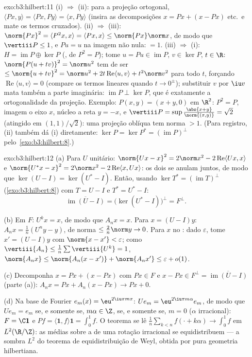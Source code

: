 \begin{solution}{exo:b3:hilbert:11}
(i) $\Rightarrow$ (ii): para a projeção ortogonal,
$\langle Px, y\rangle = \langle Px, Py\rangle = \langle x,
Py\rangle$ (insira as decomposições $x = Px + (x - Px)$
etc.\ e mate os termos cruzados). (ii) $\Rightarrow$ (iii):
$\norm{Px}^2 = \langle P^2x, x\rangle = \langle Px, x\rangle
\leq \norm{Px}\norm x$, de modo que $\vertiii P \leq 1$, e $Pu = u$
na imagem não nula: $= 1$. (iii) $\Rightarrow$ (i): $H =
\operatorname{im}P \oplus \ker P$ (, de $P^2
= P$); tome $u = Pu \in \operatorname{im}P$, $v \in \ker P$,
$t \in \R$: $\norm{P(u + tv)}^2 = \norm u^2$ tem de ser $\leq
\norm{u + tv}^2 = \norm u^2 + 2t\operatorname{Re}\langle u,
v\rangle + t^2\norm v^2$ para todo $t$, forçando
$\operatorname{Re}\langle u, v\rangle = 0$ (compare os
termos lineares quando $t \to 0^\pm$); substituir $v$ por $\iu v$
mata também a parte imaginária: $\operatorname{im}P \perp
\ker P$, que é exatamente a ortogonalidade da projeção.
Exemplo: $P(x, y) = (x + y, 0)$ em $\R^2$: $P^2 = P$,
imagem o eixo $x$, núcleo a reta $y = -x$, e
$\vertiii P = \sup\frac{\abs{x+y}}{\norm{(x,y)}} = \sqrt2$
(atingido em $(1,1)/\sqrt2$): uma projeção oblíqua tem norma
$> 1$. (Para registro, (ii) também dá (i) diretamente:
$\ker P = \ker P^* = (\operatorname{im}P)^\perp$ pelo~\cref{exo:b3:hilbert:8}.)
\end{solution}

\begin{solution}{exo:b3:hilbert:12}
(a) Para $U$ unitário: $\norm{Ux - x}^2 = 2\norm x^2 -
2\operatorname{Re}\langle Ux, x\rangle$ e $\norm{U^*x -
x}^2 = 2\norm x^2 - 2\operatorname{Re}\langle x, Ux\rangle$:
os dois se anulam juntos, de modo que $\ker(U - I) = \ker(U^* - I)$.
Então, usando $\ker T^* = (\operatorname{im}T)^\perp$
(\cref{exo:b3:hilbert:8}) com $T = U - I$ e $T^* = U^* -
I$:
\[
\overline{\operatorname{im}(U - I)} = \bigl(\ker(U^* -
I)\bigr)^\perp = F^\perp .
\]

(b) Em $F$: $U^kx = x$, de modo que $A_nx = x$. Para $x = (U - I)y$:
$A_nx = \frac1n(U^ny - y)$, de norma $\leq \frac2n\norm y \to
0$. Para $x$ no : dado $\varepsilon$, tome $x' =
(U - I)y$ com $\norm{x - x'} < \varepsilon$; como
$\vertiii{A_n} \leq \frac1n\sum\vertiii{U^k} = 1$,
$\norm{A_nx} \leq \norm{A_n(x - x')} + \norm{A_nx'} \leq
\varepsilon + o(1)$.

(c) Decomponha $x = Px + (x - Px)$ com $Px \in F$ e $x -
Px \in F^\perp = \overline{\operatorname{im}(U - I)}$ (parte
(a)): $A_nx = Px + A_n(x - Px) \to Px + 0$.

(d) Na base de Fourier $e_m(x) = \eu^{2\iu\pi mx}$: $Ue_m
= \eu^{2\iu\pi m\alpha}e_m$, de modo que $Ue_m = e_m$ se, e somente se, $m\alpha
\in \Z$, se, e somente se, $m = 0$ ($\alpha$ irracional): $F = \C\mathbf 1$
e $Pf = \langle\mathbf 1, f\rangle\mathbf 1 = \int_0^1f$.
O teorema se lê $\frac1n\sum_{k<n}f(\cdot + k\alpha) \to
\int_0^1f$ em $L^2(\R/\Z)$: as médias sobre a  de uma
rotação irracional se equidistribuem --- a sombra $L^2$ do
teorema de equidistribuição de Weyl, obtida por pura geometria
hilbertiana.
\end{solution}

